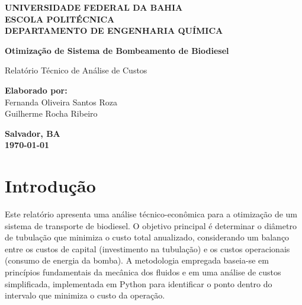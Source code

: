 \documentclass[12pt, a4paper]{article}
\begin{document}
    \begin{titlepage}
        \centering
        
        \vspace*{1.5cm}
        
        \textbf{\large UNIVERSIDADE FEDERAL DA BAHIA} \\
        \textbf{\large ESCOLA POLITÉCNICA} \\
        \textbf{\large DEPARTAMENTO DE ENGENHARIA QUÍMICA} \\
        
        \vfill
        
        {\Huge\bfseries Otimização de Sistema de Bombeamento de Biodiesel} \\
        
        \vspace{1.5cm}
        
        {\Large Relatório Técnico de Análise de Custos} \\
        
        \vfill
        
        \begin{flushleft}
            \textbf{\large Elaborado por:} \\
            \vspace{0.2cm}
            Fernanda Oliveira Santos Roza \\
            Guilherme Rocha Ribeiro
        \end{flushleft}
        
        \vfill
        
        \textbf{\large Salvador, BA} \\
        \textbf{\large \today}

    \end{titlepage}

    \tableofcontents
    \newpage


    \section{Introdução}
    \justifying
    Este relatório apresenta uma análise técnico-econômica para a otimização de um sistema de transporte de biodiesel. O objetivo principal é determinar o diâmetro de tubulação que minimiza o custo total anualizado, considerando um balanço entre os custos de capital 
    (investimento na tubulação) e os custos operacionais (consumo de energia da bomba). A metodologia empregada baseia-se em princípios fundamentais da mecânica dos fluidos e em uma análise de custos simplificada, implementada em Python para identificar o ponto dentro do intervalo que minimiza o custo da operação.
\end{document}

